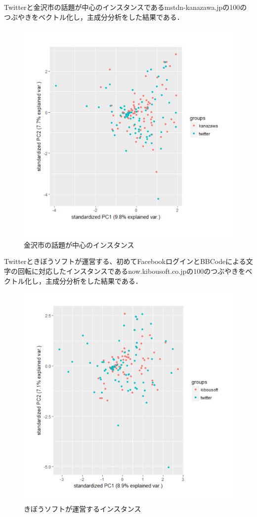 Twitterと金沢市の話題が中心のインスタンスであるmstdn-kanazawa.jpの100のつぶやきをベクトル化し，主成分分析をした結果である．
\begin{figure}[h]
\centering
\includegraphics[width=13cm,clip]{kanazawa.pdf}
\caption{金沢市の話題が中心のインスタンス}\label{kanazawa}
\end{figure}
\newpage

Twitterときぼうソフトが運営する、初めてFacebookログインとBBCodeによる文字の回転に対応したインスタンスであるnow.kibousoft.co.jpの100のつぶやきをベクトル化し，主成分分析をした結果である．
\begin{figure}[h]
\centering
\includegraphics[width=13cm,clip]{kibousoft.pdf}
\caption{きぼうソフトが運営するインスタンス}\label{kibousoft}
\end{figure}
\newpage

